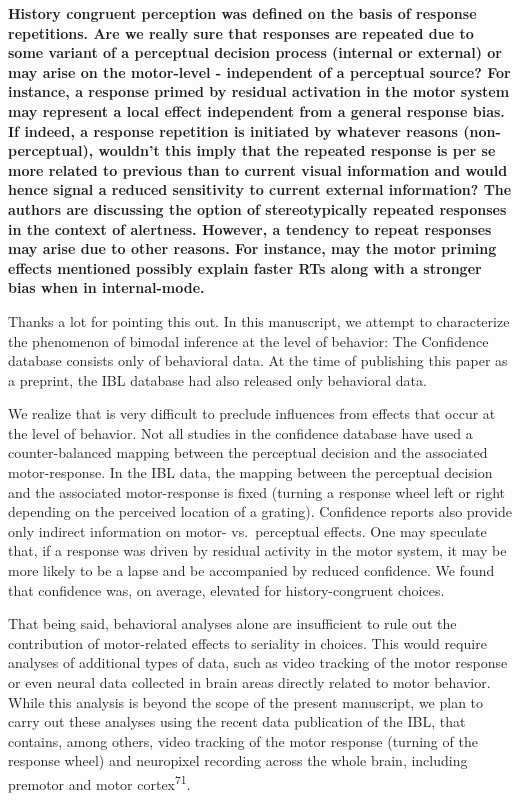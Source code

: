 \documentclass[
]{article}
\begin{document}
\textbf{History congruent perception was defined on the basis of
response repetitions. Are we really sure that responses are repeated due
to some variant of a perceptual decision process (internal or external)
or may arise on the motor-level - independent of a perceptual source?
For instance, a response primed by residual activation in the motor
system may represent a local effect independent from a general response
bias. If indeed, a response repetition is initiated by whatever reasons
(non-perceptual), wouldn't this imply that the repeated response is per
se more related to previous than to current visual information and would
hence signal a reduced sensitivity to current external information? The
authors are discussing the option of stereotypically repeated responses
in the context of alertness. However, a tendency to repeat responses may
arise due to other reasons. For instance, may the motor priming effects
mentioned possibly explain faster RTs along with a stronger bias when in
internal-mode.}

Thanks a lot for pointing this out. In this manuscript, we attempt to
characterize the phenomenon of bimodal inference at the level of
behavior: The Confidence database consists only of behavioral data. At
the time of publishing this paper as a preprint, the IBL database had
also released only behavioral data.

We realize that is very difficult to preclude influences from effects
that occur at the level of behavior. Not all studies in the confidence
database have used a counter-balanced mapping between the perceptual
decision and the associated motor-response. In the IBL data, the mapping
between the perceptual decision and the associated motor-response is
fixed (turning a response wheel left or right depending on the perceived
location of a grating). Confidence reports also provide only indirect
information on motor- vs.~perceptual effects. One may speculate that, if
a response was driven by residual activity in the motor system, it may
be more likely to be a lapse and be accompanied by reduced confidence.
We found that confidence was, on average, elevated for history-congruent
choices.

That being said, behavioral analyses alone are insufficient to rule out
the contribution of motor-related effects to seriality in choices. This
would require analyses of additional types of data, such as video
tracking of the motor response or even neural data collected in brain
areas directly related to motor behavior. While this analysis is beyond
the scope of the present manuscript, we plan to carry out these analyses
using the recent data publication of the IBL, that contains, among
others, video tracking of the motor response (turning of the response
wheel) and neuropixel recording across the whole brain, including
premotor and motor cortex\textsuperscript{71}.
\end{document}
